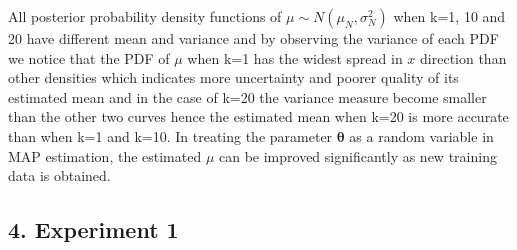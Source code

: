 \documentclass[a4paper]{article}
\begin{document}
All posterior probability density functions of $\mu \sim N(\mu_{N}, \sigma^{2}_{N})$ when k=1, 10 and 20 have different mean and variance and by observing the variance of each PDF we notice that the PDF of $\mu$ when k=1 has the widest spread in $x$ direction than other densities which indicates more uncertainty and poorer quality of its estimated mean and in the case of k=20 the variance measure become smaller than the other two curves hence the estimated mean when k=20 is more accurate than when k=1 and k=10. In treating the parameter $\boldsymbol{\theta}$ as a random variable in MAP estimation, the estimated $\mu$ can be improved significantly as new training data is obtained.

\subsection*{4. Experiment 1}

\end{document}
